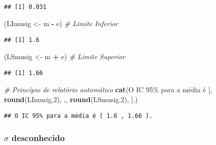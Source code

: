 \documentclass[
]{book}
\newenvironment{Shaded}{\begin{snugshade}}{\end{snugshade}}
\newcommand{\CommentTok}[1]{\textcolor[rgb]{0.56,0.35,0.01}{\textit{#1}}}
\newcommand{\DecValTok}[1]{\textcolor[rgb]{0.00,0.00,0.81}{#1}}
\newcommand{\KeywordTok}[1]{\textcolor[rgb]{0.13,0.29,0.53}{\textbf{#1}}}
\newcommand{\NormalTok}[1]{#1}
\newcommand{\OperatorTok}[1]{\textcolor[rgb]{0.81,0.36,0.00}{\textbf{#1}}}
\newcommand{\StringTok}[1]{\textcolor[rgb]{0.31,0.60,0.02}{#1}}
\theoremstyle{definition}
\theoremstyle{definition}
\theoremstyle{definition}
\theoremstyle{remark}
\begin{document}
\begin{verbatim}
## [1] 0.031
\end{verbatim}

\begin{Shaded}
\begin{Highlighting}[]
\NormalTok{(LImusig \textless{}{-}}\StringTok{ }\NormalTok{m }\OperatorTok{{-}}\StringTok{ }\NormalTok{e)              }\CommentTok{\# Limite Inferior}
\end{Highlighting}
\end{Shaded}

\begin{verbatim}
## [1] 1.6
\end{verbatim}

\begin{Shaded}
\begin{Highlighting}[]
\NormalTok{(LSmusig \textless{}{-}}\StringTok{ }\NormalTok{m }\OperatorTok{+}\StringTok{ }\NormalTok{e)              }\CommentTok{\# Limite Superior}
\end{Highlighting}
\end{Shaded}

\begin{verbatim}
## [1] 1.66
\end{verbatim}

\begin{Shaded}
\begin{Highlighting}[]
\CommentTok{\# Princípio de relatório automático}
\KeywordTok{cat}\NormalTok{(}\StringTok{\textquotesingle{}O IC 95\% para a média é [\textquotesingle{}}\NormalTok{, }
    \KeywordTok{round}\NormalTok{(LImusig,}\DecValTok{2}\NormalTok{), }\StringTok{\textquotesingle{},\textquotesingle{}}\NormalTok{, }
    \KeywordTok{round}\NormalTok{(LSmusig,}\DecValTok{2}\NormalTok{), }\StringTok{\textquotesingle{}].\textquotesingle{}}\NormalTok{)}
\end{Highlighting}
\end{Shaded}

\begin{verbatim}
## O IC 95% para a média é [ 1.6 , 1.66 ].
\end{verbatim}

\hypertarget{sigma-desconhecido}{%
\subsubsection*{\texorpdfstring{\(\sigma\) desconhecido}{\textbackslash sigma desconhecido}}\label{sigma-desconhecido}}
\end{document}
